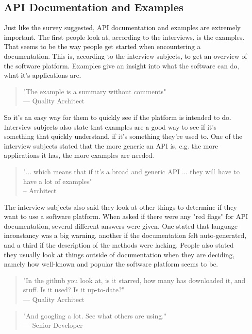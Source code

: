 \documentclass{cslthse-msc}
\begin{document}
    \subsection{API Documentation and Examples}
    Just like the survey suggested, API documentation and examples are extremely important. The first people look at, according to the interviews, is the examples. That seems to be the way people get started when encountering a documentation. This is, according to the interview subjects, to get an overview of the software platform. Examples give an insight into what the software can do, what it's applications are.
    \begin{quote}
        "The example is a summary without comments" \\
        --- Quality Architect
    \end{quote}
    So it's an easy way for them to quickly see if the platform is intended to do. Interview subjects also state that examples are a good way to see if it's something that quickly understand, if it's something they're used to. One of the interview subjects stated that the more generic an API is, e.g. the more applications it has, the more examples are needed.
    \begin{quote}
        "... which means that if it's a broad and generic API ... they will have to have a lot of examples" \\
        -- Architect
    \end{quote}
    The interview subjects also said they look at other things to determine if they want to use a software platform. When asked if there were any "red flags" for API documentation, several different answers were given. One stated that language inconstancy was a big warning, another if the documentation felt auto-generated, and a third if the description of the methods were lacking. People also stated they usually look at things outside of documentation when they are deciding, namely how well-known and popular the software platform seems to be.
    \begin{quote}
        "In the github you look at, is it starred, how many has downloaded it, and stuff. Is it used? Is it up-to-date?" \\
        --- Quality Architect
    \end{quote}
    \begin{quote}
        "And googling a lot. See what others are using."\\
        --- Senior Developer \\
    \end{quote}
\end{document}
